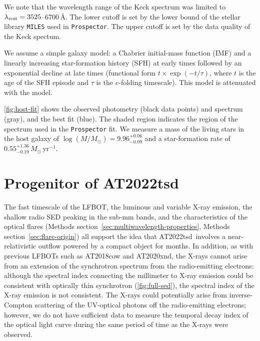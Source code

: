 \documentclass{nature_plusfigure}
\newcommand{\at}{AT2022tsd}
\begin{document}
\begin{methods}
We note that the wavelength range of the Keck spectrum was limited to $\lambda_{\rm rest}=3525$--6700\,\AA. The lower cutoff is set by the lower bound of the stellar library \texttt{MILES}\cite{SanchezBlazquez2006} used in \texttt{Prospector}. The upper cutoff is set by the data quality of the Keck spectum.%

We assume a simple galaxy model: a Chabrier initial-mass function (IMF)\cite{Chabrier2003} and a linearly increasing star-formation history (SFH) at early times followed by an exponential decline at late times (functional form $t \times \exp\left(-t/\tau\right)$, where $t$ is the age of the SFH episode and $\tau$ is the $e$-folding timescale). This model is attenuated with the \cite{Calzetti2000} model. 

\ref{fig:host-fit} shows the observed photometry (black data points) and spectrum (gray), and the best fit (blue). The shaded region indicates the region of the spectrum used in the \texttt{Prospector} fit. We measure a mass of the living stars in the host galaxy of $\log(M/M_\odot)=9.96^{+0.06}_{-0.09}$ and a star-formation rate of $0.55^{+1.36}_{-0.19}\,M_\odot\,$yr$^{-1}$.

\section{Progenitor of \at}
\label{sec:at2022tsd-origin}

The fast timescale of the LFBOT, the luminous and variable X-ray emission, the shallow radio SED peaking in the sub-mm bands, and the characteristics of the optical flares (Methods section~\ref{sec:multiwavelength-properties}, Methods section~\ref{sec:flare-origin}) all support the idea that \at\ involves a near-relativistic outflow powered by a compact object for months.
In addition, as with previous LFBOTs such as AT2018cow and AT2020xnd, the X-rays cannot arise from an extension of the synchrotron spectrum from the radio-emitting electrons\cite{Margutti2019,Ho2019,Ho2022_AT2020xnd}: although the spectral index connecting the millimeter to X-ray emission could be consistent with optically thin synchrotron (\ref{fig:full-sed}), the spectral index of the X-ray emission is not consistent.
The X-rays could potentially arise from inverse-Compton scattering of the UV-optical photons off the radio-emitting electrons; however, we do not have sufficient data to measure the temporal decay index of the optical light curve during the same period of time as the X-rays were observed.


\end{methods}
\end{document}
